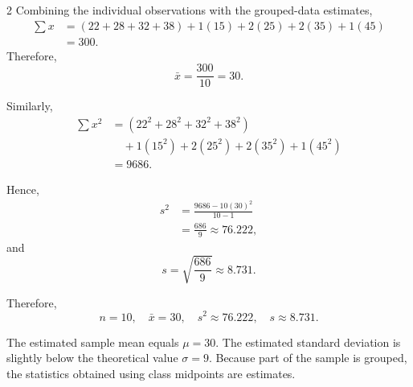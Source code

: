\begin{multicols}{2}
		Combining the individual observations with the grouped-data estimates,
		\[
		\begin{aligned}
			\sum x
			&=(22+28+32+38)
			+1(15)+2(25)+2(35)+1(45)\\
			&=300.
		\end{aligned}
		\]
		Therefore,
		\[
		\bar{x}=\frac{300}{10}=30.
		\]
		
		Similarly,
		\[
		\begin{aligned}
			\sum x^2
			&=(22^2+28^2+32^2+38^2)\\
			&\quad+1(15^2)+2(25^2)+2(35^2)+1(45^2)\\
			&=9686.
		\end{aligned}
		\]
		
		Hence,
		\[
		\begin{aligned}
			s^2
			&=\frac{9686-10(30)^2}{10-1}\\
			&=\frac{686}{9}
			\approx76.222,
		\end{aligned}
		\]
		and
		\[
		s=\sqrt{\frac{686}{9}}\approx8.731.
		\]
		
		Therefore,
		\[
		\boxed{
			n=10,\quad
			\bar{x}=30,\quad
			s^2\approx76.222,\quad
			s\approx8.731.
		}
		\]
		
		The estimated sample mean equals $\mu=30$. The estimated standard deviation
		is slightly below the theoretical value $\sigma=9$. Because part of the
		sample is grouped, the statistics obtained using class midpoints are
		estimates.
		
	\end{multicols}
	
